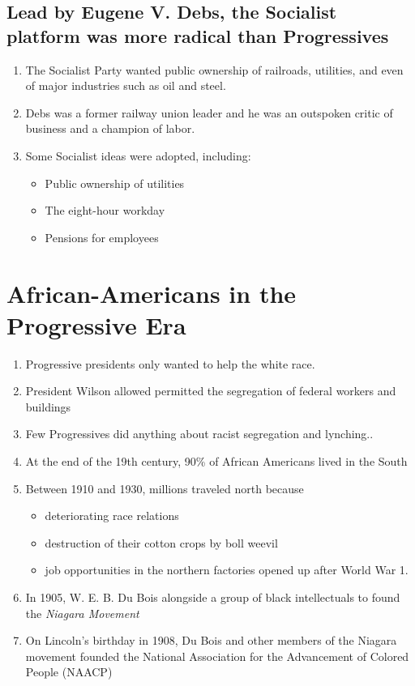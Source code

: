 \documentclass[12pt]{article} %
\begin{document}
\subsection{Lead by Eugene V. Debs, the Socialist platform was more radical than Progressives}
\begin{enumerate}
	\item The Socialist Party wanted public ownership of railroads, utilities, and even of major 
		industries such as oil and steel.
	\item Debs was a former railway union leader and he was an outspoken critic of business and a 
		champion of labor.
	\item Some Socialist ideas were adopted, including: 
	\begin{itemize}
		\item Public ownership of utilities
		\item The eight-hour workday
		\item Pensions for employees
	\end{itemize}
\end{enumerate}

\section{African-Americans in the Progressive Era}
\begin{enumerate}
	\item Progressive presidents only wanted to help the white race.
	\item President Wilson allowed permitted the segregation of federal workers and buildings
	\item Few Progressives did anything about racist segregation and lynching..
	\item At the end of the 19th century, 90\% of African Americans lived in the South
	\item Between 1910 and 1930, millions traveled north because 
	\begin{itemize}
		\item deteriorating race relations
		\item destruction of their cotton crops by boll weevil
		\item job opportunities in the northern factories opened up after World War 1.
	\end{itemize}
	\item In 1905, W. E. B. Du Bois alongside a group of black intellectuals to found the 
		\textit{Niagara Movement}
	\item On Lincoln's birthday in 1908, Du Bois and other members of the Niagara movement founded
		the National Association for the Advancement of Colored People (NAACP)
\end{enumerate}
\end{document}
